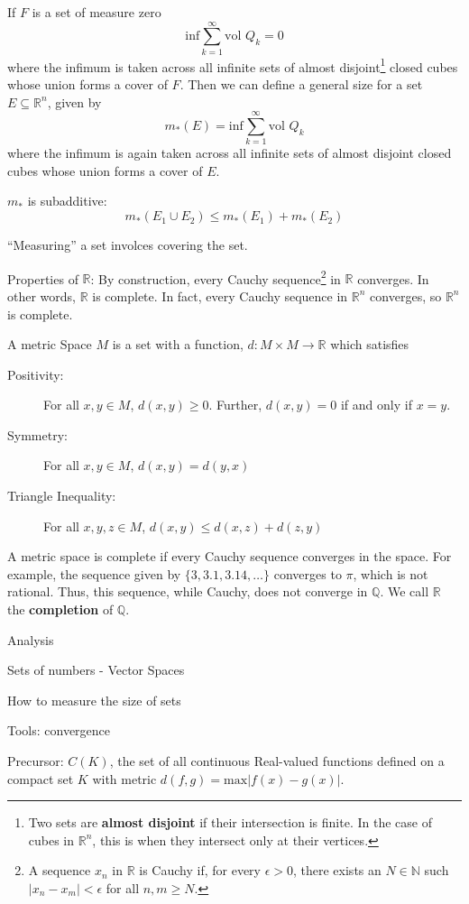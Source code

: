 \documentclass[12pt,leqno]{article}
\numberwithin{equation}{section}
\theoremstyle{definition}
\begin{document}
If $F$ is a set of measure zero\[\text{inf}\sum_{k=1}^{\infty}\text{vol }Q_k=0\] where the infimum is taken across all infinite sets of almost disjoint\footnote{Two sets are \textbf{almost disjoint} if their intersection is finite. In the case of cubes in $\mathbb{R}^n$, this is when they intersect only at their vertices.} closed cubes whose union forms a cover of $F$.  Then we can define a general size for a set $E\subseteq\mathbb{R}^n$, given by \[m_*(E)=\text{inf}\sum_{k=1}^{\infty}\text{vol }Q_k\] where the infimum is again taken across all infinite sets of almost disjoint closed cubes whose union forms a cover of $E$.

$m_*$ is subadditive: \[m_*(E_1\cup E_2)\leq m_*(E_1)+m_*(E_2)\]

``Measuring'' a set involces covering the set.

Properties of $\mathbb{R}$: By construction, every Cauchy sequence\footnote{A sequence $x_n$ in $\mathbb{R}$ is Cauchy if, for every $\epsilon>0$, there exists an $N\in\mathbb{N}$ such $|x_n-x_m|<\epsilon$ for all $n,m\geq N$.} in $\mathbb{R}$ converges. In other words, $\mathbb{R}$ is complete. In fact, every Cauchy sequence in $\mathbb{R}^n$ converges, so $\mathbb{R}^n$ is complete.

A metric Space $M$ is a set with a function, $d:M\times M\to\mathbb{R}$ which satisfies
\begin{description}
 \item [Positivity:] For all $x,y\in M$, $d(x,y)\geq0$. Further, $d(x,y)=0$ if and only if $x=y$.
 \item [Symmetry:] For all $x,y\in M$, $d(x,y)=d(y,x)$
 \item [Triangle Inequality:] For all $x,y,z\in M$, $d(x,y)\leq d(x,z)+d(z,y)$
\end{description}

A metric space is complete if every Cauchy sequence converges in the space. For example, the sequence given by $\{3,3.1,3.14,\hdots\}$ converges to $\pi$, which is not rational. Thus, this sequence, while Cauchy, does not converge in $\mathbb{Q}$. We call $\mathbb{R}$ the \textbf{completion} of $\mathbb{Q}$.

Analysis

Sets of numbers - Vector Spaces

How to measure the size of sets

Tools: convergence

Precursor: $C(K)$, the set of all continuous Real-valued functions defined on a compact set $K$ with metric $d(f,g)=\text{max}|f(x)-g(x)|$.
\end{document}
